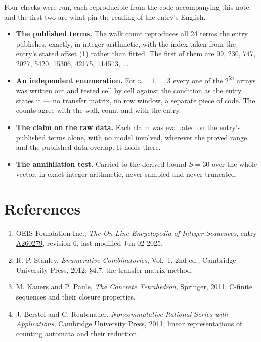 \documentclass[11pt]{article}
\theoremstyle{definition}
\begin{document}
Four checks were run, each reproducible from the code accompanying this note, and the first two are what pin the reading of the entry's English.

\begin{itemize}

\item {\bfseries The published terms.} The walk count reproduces all 24 terms the entry publishes, exactly, in integer arithmetic, with the index taken from the entry's stated offset (1) rather than fitted. The first of them are 99, 230, 747, 2027, 5420, 15306, 42175, 114513,~\dots

\item {\bfseries An independent enumeration.} For $n = 1,\dots,3$ every one of the $2^{5n}$ arrays was written out and tested cell by cell against the condition as the entry states it --- no transfer matrix, no row window, a separate piece of code. The counts agree with the walk count and with the entry.

\item {\bfseries The claim on the raw data.} Each claim was evaluated on the entry's published terms alone, with no model involved, wherever the proved range and the published data overlap. It holds there.

\item {\bfseries The annihilation test.} Carried to the derived bound $S = 30$ over the whole vector, in exact integer arithmetic, never sampled and never truncated.

\end{itemize}

\section{References}

\begin{enumerate}

\item OEIS Foundation Inc., \emph{The On-Line Encyclopedia of Integer Sequences}, entry \href{https://oeis.org/A260279}{A260279}, revision 6, last modified Jun 02 2025.

\item R. P. Stanley, \emph{Enumerative Combinatorics}, Vol.~1, 2nd ed., Cambridge University Press, 2012; \S4.7, the transfer-matrix method.

\item M. Kauers and P. Paule, \emph{The Concrete Tetrahedron}, Springer, 2011; C-finite sequences and their closure properties.

\item J. Berstel and C. Reutenauer, \emph{Noncommutative Rational Series with Applications}, Cambridge University Press, 2011; linear representations of counting automata and their reduction.

\end{enumerate}
\end{document}
